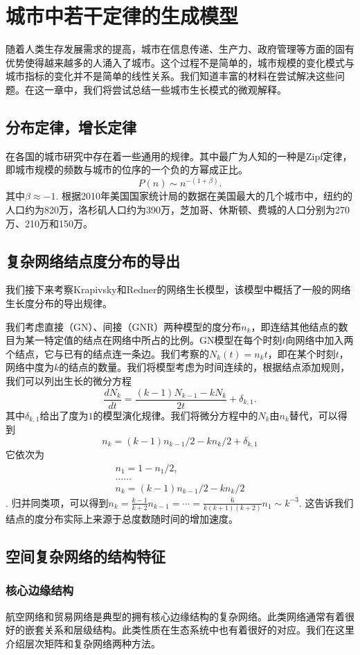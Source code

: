 
\chapter{城市中若干定律的生成模型}

随着人类生存发展需求的提高，城市在信息传递、生产力、政府管理等方面的固有优势使得越来越多的人涌入了城市。这个过程不是简单的，城市规模的变化模式与城市指标的变化并不是简单的线性关系。我们知道丰富的材料在尝试解决这些问题。在这一章中，我们将尝试总结一些城市生长模式的微观解释。

\section{分布定律，增长定律}

在各国的城市研究中存在着一些通用的规律。其中最广为人知的一种是Zipf定律，即城市规模的频数与城市的位序的一个负的方幂成正比。\[P(n)\sim n^{-(1+\beta)}.\]其中$\beta\approx -1$. 根据2010年美国国家统计局的数据在美国最大的几个城市中，纽约的人口约为820万，洛杉矶人口约为390万，芝加哥、休斯顿、费城的人口分别为270万、210万和150万。

\section{复杂网络结点度分布的导出}

我们接下来考察Krapivsky和Redner的网络生长模型，该模型中概括了一般的网络生长度分布的导出规律。

我们考虑直接（GN）、间接（GNR）两种模型的度分布$n_k$，即连结其他结点的数目为某一特定值的结点在网络中所占的比例。GN模型在每个时刻$t$向网络中加入两个结点，它与已有的结点连一条边。我们考察的$N_k(t)=n_kt$，即在某个时刻$t$，网络中度为$k$的结点的数量。我们将模型考虑为时间连续的，根据结点添加规则，我们可以列出生长的微分方程\[\frac{dN_k}{dt} = \frac{(k-1)N_{k-1}-kN_{k}}{2t} +\delta_{k,1}. \] 其中$\delta_{k,1}$给出了度为$1$的模型演化规律。我们将微分方程中的$N_k$由$n_k$替代，可以得到\[n_k = (k-1)n_{k-1}/2-kn_k/2 +\delta_{k,1} \]它依次为\begin{align}
    n_1 = 1-n_1/2, \\ \dots\dots \\ n_k = (k-1)n_{k-1}/2 - kn_{k}/2
\end{align}.
归并同类项，可以得到$n_k = \frac{k-1}{k+2}n_{k-1} = \cdots = \frac{6}{k(k+1)(k+2)} n_1\sim k^{-3}$. 这告诉我们结点的度分布实际上来源于总度数随时间的增加速度。


\section{空间复杂网络的结构特征}

\subsection{核心边缘结构}

航空网络和贸易网络是典型的拥有核心边缘结构的复杂网络\cite{verma2016emergence}。此类网络通常有着很好的嵌套关系和层级结构。此类性质在生态系统中也有着很好的对应。我们在这里介绍层次矩阵和复杂网络两种方法。